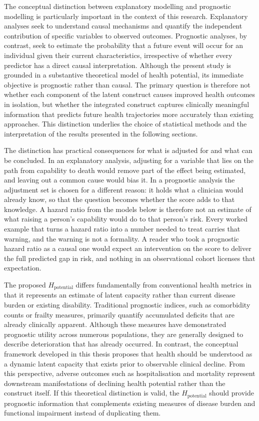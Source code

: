 The conceptual distinction between explanatory modelling and prognostic modelling is particularly important in the context of this research. Explanatory analyses seek to understand causal mechanisms and quantify the independent contribution of specific variables to observed outcomes. Prognostic analyses, by contrast, seek to estimate the probability that a future event will occur for an individual given their current characteristics, irrespective of whether every predictor has a direct causal interpretation. Although the present study is grounded in a substantive theoretical model of health potential, its immediate objective is prognostic rather than causal. The primary question is therefore not whether each component of the latent construct causes improved health outcomes in isolation, but whether the integrated construct captures clinically meaningful information that predicts future health trajectories more accurately than existing approaches. This distinction underlies the choice of statistical methods and the interpretation of the results presented in the following sections.

The distinction has practical consequences for what is adjusted for and what can be concluded. In an explanatory analysis, adjusting for a variable that lies on the path from capability to death would remove part of the effect being estimated, and leaving out a common cause would bias it. In a prognostic analysis the adjustment set is chosen for a different reason: it holds what a clinician would already know, so that the question becomes whether the score adds to that knowledge. A hazard ratio from the models below is therefore not an estimate of what raising a person's capability would do to that person's risk. Every worked example that turns a hazard ratio into a number needed to treat carries that warning, and the warning is not a formality. A reader who took a prognostic hazard ratio as a causal one would expect an intervention on the score to deliver the full predicted gap in risk, and nothing in an observational cohort licenses that expectation.

The proposed $H_{\text{potential}}$ differs fundamentally from conventional health metrics in that it represents an estimate of latent capacity rather than current disease burden or existing disability. Traditional prognostic indices, such as comorbidity counts or frailty measures, primarily quantify accumulated deficits that are already clinically apparent. Although these measures have demonstrated prognostic utility across numerous populations, they are generally designed to describe deterioration that has already occurred. In contrast, the conceptual framework developed in this thesis proposes that health should be understood as a dynamic latent capacity that exists prior to observable clinical decline. From this perspective, adverse outcomes such as hospitalisation and mortality represent downstream manifestations of declining health potential rather than the construct itself. If this theoretical distinction is valid, the $H_{\text{potential}}$ should provide prognostic information that complements existing measures of disease burden and functional impairment instead of duplicating them.


